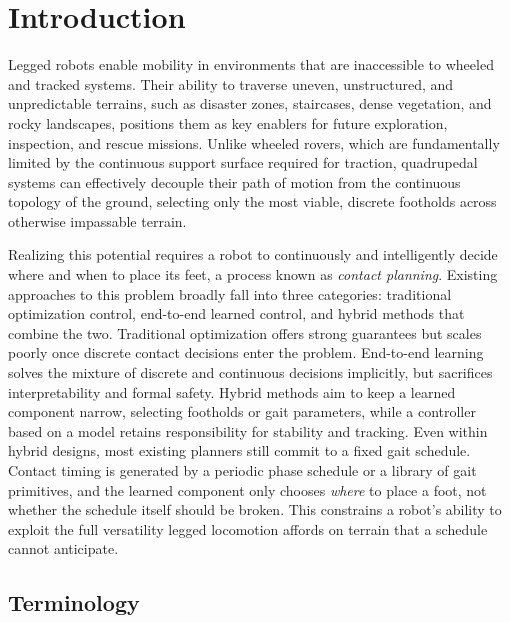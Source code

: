 \section{Introduction}
\label{sec:introduction}

Legged robots enable mobility in
environments that are inaccessible to wheeled and tracked systems.
Their ability to traverse uneven, unstructured, and unpredictable
terrains, such as disaster zones, staircases, dense
vegetation, and rocky landscapes, positions them as key
enablers for future exploration, inspection, and rescue missions.
Unlike wheeled rovers, which are fundamentally limited by the continuous
support surface required for traction, quadrupedal systems can effectively
decouple their path of motion from the continuous topology of the ground,
selecting only the most viable, discrete footholds across otherwise
impassable terrain.

Realizing this potential requires a robot to continuously and
intelligently decide where and when to place its feet, a
process known as \textit{contact planning}. Existing approaches to
this problem broadly fall into three categories: traditional
optimization control, end-to-end learned control, and hybrid
methods that combine the two. Traditional optimization offers strong
guarantees but scales poorly once discrete contact decisions enter
the problem. End-to-end learning solves the mixture of discrete and
continuous decisions implicitly, but sacrifices interpretability and
formal safety. Hybrid methods aim to keep a learned component narrow,
selecting footholds or gait parameters, while a controller based on a
model retains responsibility for stability and tracking. Even
within hybrid designs, most existing planners still commit to a
fixed gait schedule. Contact timing is generated by a periodic phase
schedule or a library of gait primitives, and the learned component
only chooses \textit{where} to place a foot, not whether the
schedule itself should be broken. This constrains a robot's ability
to exploit the full versatility legged locomotion affords on terrain
that a schedule cannot anticipate.

\subsection{Terminology}
\label{subsec:introduction-terminology}


